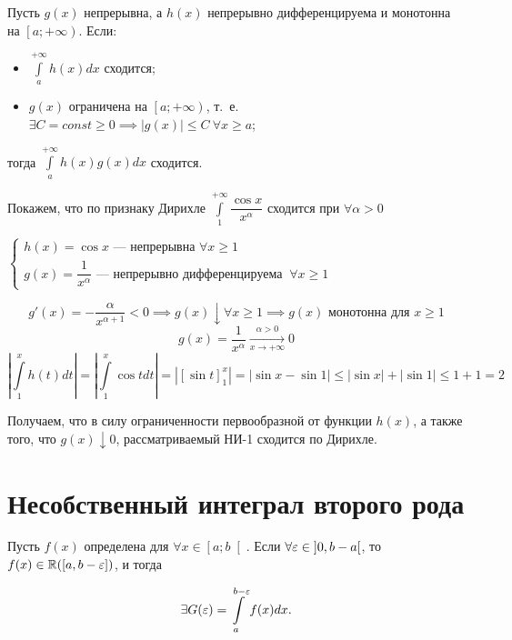 \documentclass[../../main.tex]{subfiles}
\begin{document}
\begin{thm}
Пусть $g(x)$ непрерывна, а $h(x)$ непрерывно дифференцируема и монотонна на 
$\left[a; +\infty \right)$. Если:
\begin{itemize}
\item[а)] $\displaystyle\int\limits_{a}^{+\infty}h(x)dx$ сходится;

\item[б)] $g(x)$ ограничена на $\left[a; +\infty\right)$, т.~е. $\exists C = 
const\geq 0 \implies \left| g(x) \right| \leq C \ \forall x \geq a$;
\end{itemize}
тогда $\displaystyle\int\limits_{a}^{+\infty} h(x)g(x)dx$ сходится.
\end{thm}

\begin{exmp}
 Покажем, что по признаку Дирихле
 $\displaystyle\int\limits_{1}^{+\infty}\dfrac{\cos{x}}{x^{\alpha}}$ сходится 
 при 
 $\forall \alpha > 0$
 
 $\begin{cases}
 h(x) = \cos{x} \text{~--- непрерывна } \forall x \geq 1\\
 g(x) = \dfrac{1}{x^{\alpha}} \text{~--- непрерывно дифференцируема }\ \forall 
 x \geq 1
 \end{cases}$
 
 \[g'(x) = -\dfrac{\alpha}{x^{\alpha + 1}} < 0 \implies g(x) \downarrow 
 \forall 
 x \geq 1 \implies g(x) \text{ монотонна для $x \geq 1$}\]
 \[g(x) = \dfrac{1}{x^{\alpha}} \xrightarrow[x \to +\infty]{\alpha > 0} 0\]
 \[\left| \int\limits_{1}^{x}h(t)dt\right| = 
 \left|\int\limits_{1}^{x}\cos{t}dt\right| = \left| \left[ 
 \sin{t}\right]_{1}^{x} \right| = \left| \sin{x} - \sin{1} \right| \leq \left| 
 \sin{x} \right| + \left| \sin{1} \right| \leq 1 + 1 = 2\]

  Получаем, что в силу ограниченности первообразной от функции $h(x)$, а также 
  того, что $g(x) \downarrow 0$, рассматриваемый НИ-1 сходится по Дирихле.
 \end{exmp}
 
 \section{Несобственный интеграл второго рода}
 
 Пусть $f(x)$ определена для $\forall x \in \left[a; b \right[$. Если $\forall 
 \varepsilon \in \left] 0, b - a \right[$, то $f(x) \in \mathbb{R}(\left[a, b - 
 \varepsilon\right])$, и тогда

\begin{equation}\label{lec8:2}
\exists G(\varepsilon) = \displaystyle\int\limits_{a}^{b - \varepsilon}f(x)dx.
\end{equation}
\end{document}
